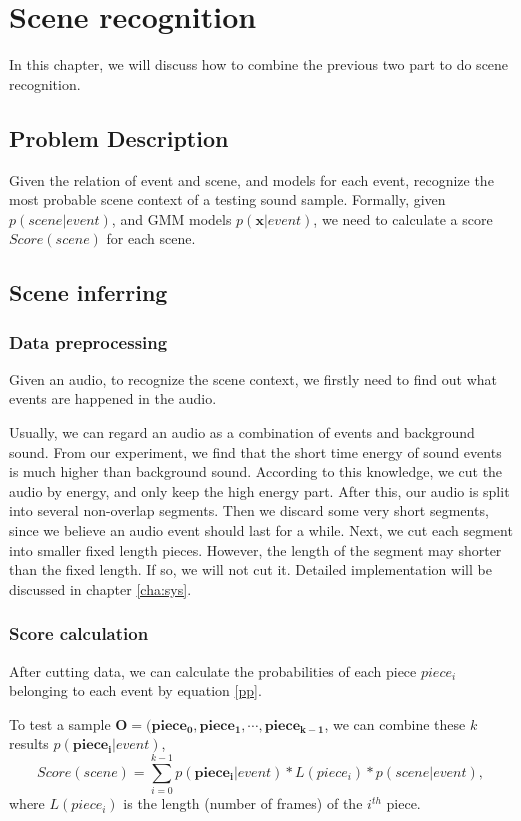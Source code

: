 \chapter{Scene recognition}
In this chapter, we will discuss how to combine the previous two part to do scene recognition.

\section{Problem Description}
Given the relation of event and scene, and models for each event, recognize the most probable scene context of a testing sound sample. Formally, given $p(scene|event)$, and GMM models $p(\mathbf{x}|event)$, we need to calculate a score $Score(scene)$ for each scene.

\section{Scene inferring}
\subsection{Data preprocessing}
\label{sec:datapre}
Given an audio, to recognize the scene context, we firstly need to find out what events are happened in the audio. 

Usually, we can regard an audio as a combination of events and background sound. From our experiment, we find that the short time energy of sound events is much higher than background sound. According to this knowledge, we cut the audio by energy, and only keep the high energy part. After this, our audio is split into several non-overlap segments. Then we discard some very short segments, since we believe an audio event should last for a while. Next, we cut each segment into smaller fixed length pieces. However, the length of the segment may shorter than the fixed length. If so, we will not cut it. Detailed implementation will be discussed in chapter \ref{cha:sys}.

\subsection{Score calculation}
After cutting data, we can calculate the probabilities of each piece $piece_i$ belonging to each event by equation \ref{pp}.

To test a sample $\mathbf{O}=(\mathbf{piece_0}, \mathbf{piece_1}, \cdots, \mathbf{piece_{k-1}}$, we can combine these $k$ results $p(\mathbf{piece_i}|event)$, \ie
\begin{equation}
\label{sc}
Score(scene) = \sum_{i=0}^{k-1} p(\mathbf{piece_i}|event)*L(piece_i)*p(scene|event),
\end{equation}
where $L(piece_i)$ is the length (number of frames) of the $i^{th}$ piece.



